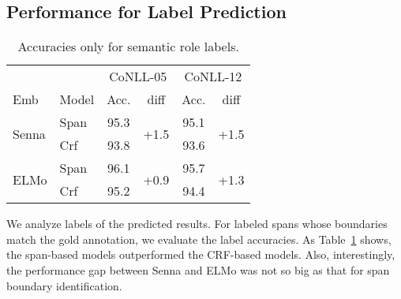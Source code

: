 \documentclass[11pt,a4paper]{article}
\begin{document}
\subsection{Performance for Label Prediction}
\label{sec:lp}
\begin{table}[t]
  \centering
  {\small
  \begin{tabular}{llcccc} \toprule
                  & & \multicolumn{2}{c}{CoNLL-05} & \multicolumn{2}{c}{CoNLL-12} \\
                  {\sc Emb}& {\sc Model} & Acc. & diff & Acc. & diff \\ \hline
\multirow{2}{*}{\sc Senna} & {\sc Span}    & 95.3 & \multirow{2}{*}{+1.5} & 95.1 & \multirow{2}{*}{+1.5} \\
 & {\sc Crf}       & 93.8 &  & 93.6 & \\ \hline
\multirow{2}{*}{\sc ELMo} & {\sc Span}     & 96.1 & \multirow{2}{*}{+0.9}  & 95.7 & \multirow{2}{*}{+1.3} \\
 & {\sc Crf}        & 95.2 &   & 94.4 &  \\ \toprule
  \end{tabular}
  }
  \caption{\label{tab:label-prediction} Accuracies only for semantic role labels.}
\end{table}

We analyze labels of the predicted results.
For labeled spans whose boundaries match the gold annotation, we evaluate the label accuracies.
As Table~\ref{tab:label-prediction} shows, the span-based models outperformed the CRF-based models.
Also, interestingly, the performance gap between {\sc Senna} and {\sc ELMo} was not so big as that for span boundary identification.
\end{document}
